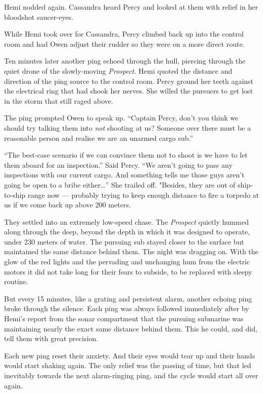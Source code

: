 \documentclass[]{scrbook}
\begin{document}
Hemi nodded again. Cassandra heard Percy and looked at them with relief
in her bloodshot saucer-eyes.

While Hemi took over for Cassandra, Percy climbed back up into the
control room and had Owen adjust their rudder so they were on a more
direct route.

Ten minutes later another ping echoed through the hull, piercing through
the quiet drone of the slowly-moving \emph{Prospect}. Hemi quoted the
distance and direction of the ping source to the control room. Percy
ground her teeth against the electrical ring that had shook her nerves.
She willed the pursuers to get lost in the storm that still raged above.

The ping prompted Owen to speak up. ``Captain Percy, don't you think we
should try talking them into \emph{not} shooting at us? Someone over
there must be a reasonable person and realise we are an unarmed cargo
sub.''

``The best-case scenario if we can convince them not to shoot is we have
to let them aboard for an inspection.'' Said Percy. ``We aren't going to
pass any inspections with our current cargo. And something tells me
those guys aren't going be open to a bribe either\ldots{}'' She trailed
off. "Besides, they are out of ship-to-ship range now --- probably
trying to keep enough distance to fire a torpedo at us if we come back
up above 200 meters.

They settled into an extremely low-speed chase. The \emph{Prospect}
quietly hummed along through the deep, beyond the depth in which it was
designed to operate, under 230 meters of water. The pursuing sub stayed
closer to the surface but maintained the same distance behind them. The
night was dragging on. With the glow of the red lights and the pervading
and unchanging hum from the electric motors it did not take long for
their fears to subside, to be replaced with sleepy routine.

But every 15 minutes, like a grating and persistent alarm, another
echoing ping broke through the silence. Each ping was always followed
immediately after by Hemi's report from the sonar compartment that the
pursuing submarine was maintaining nearly the exact same distance behind
them. This he could, and did, tell them with great precision.

Each new ping reset their anxiety. And their eyes would tear up and
their hands would start shaking again. The only relief was the passing
of time, but that led inevitably towards the next alarm-ringing ping,
and the cycle would start all over again.
\end{document}
